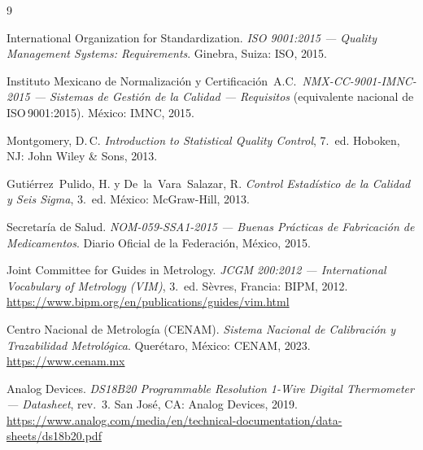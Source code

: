 \begin{thebibliography}{9}

International Organization for Standardization.
\textit{ISO 9001:2015 --- Quality Management Systems: Requirements}.
Ginebra, Suiza: ISO, 2015.

Instituto Mexicano de Normalizaci\'on y Certificaci\'on~A.C.\
\textit{NMX-CC-9001-IMNC-2015 --- Sistemas de Gesti\'on de la Calidad ---
Requisitos} (equivalente nacional de ISO\,9001:2015).
M\'exico: IMNC, 2015.

Montgomery, D.\,C.
\textit{Introduction to Statistical Quality Control}, 7.\textordfeminine~ed.
Hoboken, NJ: John Wiley \& Sons, 2013.

Guti\'errez~Pulido, H. y De~la~Vara~Salazar, R.
\textit{Control Estad\'istico de la Calidad y Seis Sigma}, 3.\textordfeminine~ed.
M\'exico: McGraw-Hill, 2013.

Secretar\'ia de Salud.
\textit{NOM-059-SSA1-2015 --- Buenas Pr\'acticas de Fabricaci\'on de
Medicamentos}.
Diario Oficial de la Federaci\'on, M\'exico, 2015.

Joint Committee for Guides in Metrology.
\textit{JCGM 200:2012 --- International Vocabulary of Metrology (VIM)},
3.\textordfeminine~ed.
S\`evres, Francia: BIPM, 2012.
\url{https://www.bipm.org/en/publications/guides/vim.html}

Centro Nacional de Metrolog\'ia (CENAM).
\textit{Sistema Nacional de Calibraci\'on y Trazabilidad Metrol\'ogica}.
Quer\'etaro, M\'exico: CENAM, 2023.
\url{https://www.cenam.mx}

Analog Devices.
\textit{DS18B20 Programmable Resolution 1-Wire Digital Thermometer ---
Datasheet}, rev.~3.
San Jos\'e, CA: Analog Devices, 2019.
\url{https://www.analog.com/media/en/technical-documentation/data-sheets/ds18b20.pdf}

\end{thebibliography}


